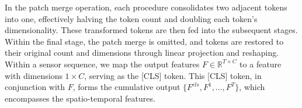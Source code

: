 \documentclass[letterpaper]{article} %
\begin{document}
In the patch merge operation, each procedure consolidates two adjacent tokens into one, effectively halving the token count and doubling each token's dimensionality. These transformed tokens are then fed into the subsequent stages. Within the final stage, the patch merge is omitted, and tokens are restored to their original count and dimensions through linear projection and reshaping.
Within a sensor sequence, we map the output features $F \in \mathbb{R}^{T\times C}$ to a feature with dimensions $1\times C$, serving as the [CLS] token. This [CLS] token, in conjunction with $F$, forms the cumulative output $\{F^{cls}, F^{1}, ..., F^{T}\}$, which encompasses the spatio-temporal features.







\end{document}
